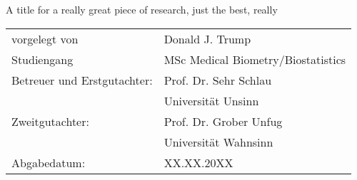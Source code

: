 \vspace*{2em}
\begin{center}
	{\large A title for a really great piece of research, just the best, really}
\end{center}

\vspace{10em}
\begin{tabular}{ll} \\ \toprule
	vorgelegt von 			& Donald J. Trump \\
	Studiengang 			& MSc Medical Biometry/Biostatistics \\
Betreuer und Erstgutachter: & Prof. Dr. Sehr Schlau \\
					 		& Universit\"at Unsinn\\
Zweitgutachter: 			& Prof. Dr. Grober Unfug \\
							& Universit\"at Wahnsinn \\
Abgabedatum:				& XX.XX.20XX \\\bottomrule
\end{tabular}